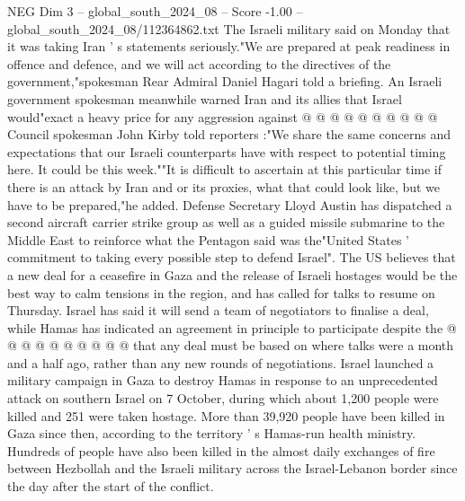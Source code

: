 \begin{textsample}{NEG Dim 3 – global\_south\_2024\_08 – Score -1.00 – global\_south\_2024\_08/112364862.txt}
The Israeli military said on Monday that it was taking Iran ' s statements seriously."We are prepared at peak readiness in offence and defence, and we will act according to the directives of the government,"spokesman Rear Admiral Daniel Hagari told a briefing.
An Israeli government spokesman meanwhile warned Iran and its allies that Israel would"exact a heavy price for any aggression against @ @ @ @ @ @ @ @ @ @ Council spokesman John Kirby told reporters :"We share the same concerns and expectations that our Israeli counterparts have with respect to potential timing here.
It could be this week.""It is difficult to ascertain at this particular time if there is an attack by Iran and or its proxies, what that could look like, but we have to be prepared,"he added.
Defense Secretary Lloyd Austin has dispatched a second aircraft carrier strike group as well as a guided missile submarine to the Middle East to reinforce what the Pentagon said was the"United States ' commitment to taking every possible step to defend Israel".
The US believes that a new deal for a ceasefire in Gaza and the release of Israeli hostages would be the best way to calm tensions in the region, and has called for talks to resume on Thursday.
Israel has said it will send a team of negotiators to finalise a deal, while Hamas has indicated an agreement in principle to participate despite the @ @ @ @ @ @ @ @ @ @ that any deal must be based on where talks were a month and a half ago, rather than any new rounds of negotiations.
Israel launched a military campaign in Gaza to destroy Hamas in response to an unprecedented attack on southern Israel on 7 October, during which about 1,200 people were killed and 251 were taken hostage.
More than 39,920 people have been killed in Gaza since then, according to the territory ' s Hamas-run health ministry.
Hundreds of people have also been killed in the almost daily exchanges of fire between Hezbollah and the Israeli military across the Israel-Lebanon border since the day after the start of the conflict.

\end{textsample}

